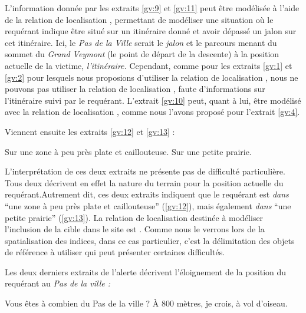 L'information donnée par les extraits \ref{gv:9} et \ref{gv:11} peut
être modélisée à l'aide de la relation de localisation
, permettant de modéliser une
situation où le requérant indique être situé sur un itinéraire donné
et avoir dépassé un jalon sur cet itinéraire. Ici, le \emph{Pas de la
  Ville} serait le \emph{jalon} et le parcours menant du sommet du
\emph{Grand Veymont} (\ie le point de départ de la descente) à la
position actuelle de la victime, \emph{l'itinéraire.} Cependant, comme
pour les extraits \ref{gv:1} et \ref{gv:2} pour lesquels nous
proposions d'utiliser la relation de localisation
, nous ne pouvons pas utiliser
la relation de localisation ,
faute d'informations sur l'itinéraire suivi par le
requérant. L'extrait \ref{gv:10} peut, quant à lui, être modélisé avec
la relation de localisation , comme nous
l'avons proposé pour l'extrait \ref{gv:4}.

Viennent ensuite les extraits \ref{gv:12} et \ref{gv:13} :
%
\begin{dialogue*}
  \Req {} Sur une zone à peu près plate et
  caillouteuse.  Sur une petite prairie.
\end{dialogue*}

L'interprétation de ces deux extraits ne présente pas de difficulté
particulière. Tous deux décrivent en effet la nature du terrain pour
la position actuelle du requérant.Autrement dit, ces deux extraits
indiquent que le requérant est \emph{dans} \enquote{une zone à peu
  près plate et caillouteuse} (\ref{gv:12}), mais également
\emph{dans} \enquote{une petite prairie} (\ref{gv:13}). La relation de
localisation destinée à modéliser l'inclusion de la cible dans le site
est . Comme nous le verrons lors de la
spatialisation des indices, dans ce cas particulier, c'est la
délimitation des objets de référence à utiliser qui peut présenter
certaines difficultés.

Les deux derniers extraits de l'alerte décrivent l'éloignement de la
position du requérant au \emph{Pas de la ville :}
%
\begin{dialogue*}
  \Sec {} Vous êtes à combien du Pas de la ville ?
  \Req {} À 800 mètres, je crois, à vol d'oiseau.
\end{dialogue*}

